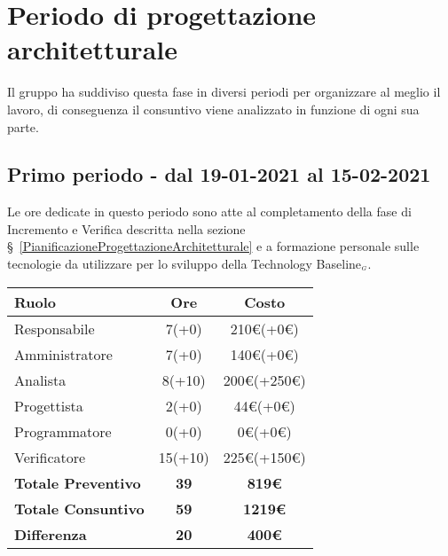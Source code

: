 {{\section{Periodo di progettazione architetturale}\label{ConsuntivoPeriodoDiProgettazioneArchitetturale}

Il gruppo ha suddiviso questa fase in diversi periodi per organizzare al meglio il lavoro, di conseguenza il consuntivo viene analizzato in funzione di ogni sua parte.

\subsection{Primo periodo - dal 19-01-2021 al 15-02-2021}\label{ConsuntivoPeriodoDiProgettazioneArchitetturaleIncrementoEVerifica}

Le ore dedicate in questo periodo sono atte al completamento della fase di Incremento e Verifica descritta nella sezione \S~\ref{PianificazioneProgettazioneArchitetturale} e a formazione personale sulle tecnologie da utilizzare per lo sviluppo della Technology Baseline$_{\scaleto{G}{3pt}}$.

\quad
\def\tabularxcolumn#1{m{#1}}
{
	\begin{center}
		\renewcommand{\arraystretch}{1.4}
		\begin{tabularx}{10cm}{|X|c|c|}
			\hline
			\rowcolor{airforceblue}
			\textbf{Ruolo} & \textbf{Ore} & \textbf{Costo}\\
			\hline
			Responsabile & 7(+0) & 210\euro(+0\euro)\\
			\hline
			Amministratore & 7(+0) & 140\euro(+0\euro)\\
			\hline
			Analista & 8(+10) & 200\euro(+250\euro)\\
			\hline
			Progettista & 2(+0) & 44\euro(+0\euro)\\
			\hline
			Programmatore & 0(+0) & 0\euro(+0\euro)\\
			\hline
			Verificatore & 15(+10) & 225\euro(+150\euro)\\
			\hline
			\textbf{Totale Preventivo} & \textbf{39} & \textbf{819\euro}\\
			\hline
			\textbf{Totale Consuntivo} & \textbf{59} & \textbf{1219\euro}\\
			\hline
			\textbf{Differenza} & \textbf{20} & \textbf{400\euro}
		\end{tabularx}
	\end{center}

}}}
